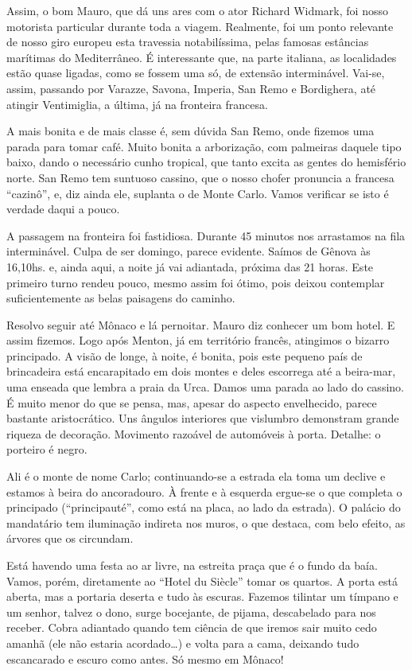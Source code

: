 Assim, o bom Mauro, que dá uns ares com o ator Richard Widmark, foi nosso motorista particular durante toda a viagem. Realmente, foi um ponto relevante de nosso giro europeu esta travessia notabilíssima, pelas famosas estâncias marítimas do Mediterrâneo. É interessante que, na parte italiana, as localidades estão quase ligadas, como se fossem uma só, de extensão interminável. Vai-se, assim, passando por Varazze, Savona, Imperia, San Remo e Bordighera, até atingir Ventimiglia, a última, já na fronteira francesa.

A mais bonita e de mais classe é, sem dúvida San Remo, onde fizemos uma parada para tomar café. Muito bonita a arborização, com palmeiras daquele tipo baixo, dando o necessário cunho tropical, que tanto excita as gentes do hemisfério norte. San Remo tem suntuoso cassino, que o nosso chofer pronuncia a francesa “cazinô”, e, diz ainda ele, suplanta o de Monte Carlo. Vamos verificar se isto é verdade daqui a pouco.

A passagem na fronteira foi fastidiosa. Durante 45 minutos nos arrastamos na fila interminável. Culpa de ser domingo, parece evidente. Saímos de Gênova às 16,10hs. e, ainda aqui, a noite já vai adiantada, próxima das 21 horas. Este primeiro turno rendeu pouco, mesmo assim foi ótimo, pois deixou contemplar suficientemente as belas paisagens do caminho.

Resolvo seguir até Mônaco e lá pernoitar. Mauro diz conhecer um bom hotel. E assim fizemos. Logo após Menton, já em território francês, atingimos o bizarro principado. A visão de longe, à noite, é bonita, pois este pequeno país de brincadeira está encarapitado em dois montes e deles escorrega até a beira-mar, uma enseada que lembra a praia da Urca. Damos uma parada ao lado do cassino. É muito menor do que se pensa, mas, apesar do aspecto envelhecido, parece bastante aristocrático. Uns ângulos interiores que vislumbro demonstram grande riqueza de decoração. Movimento razoável de automóveis à porta. Detalhe: o porteiro é negro.

Ali é o monte de nome Carlo; continuando-se a estrada ela toma um declive e estamos à beira do ancoradouro. À frente e à esquerda ergue-se o que completa o principado (“principauté”, como está na placa, ao lado da estrada). O palácio do mandatário tem iluminação indireta nos muros, o que destaca, com belo efeito, as árvores que os circundam.

Está havendo uma festa ao ar livre, na estreita praça que é o fundo da baía. Vamos, porém, diretamente ao “Hotel du Siècle” tomar os quartos. A porta está aberta, mas a portaria deserta e tudo às escuras. Fazemos tilintar um tímpano e um senhor, talvez o dono, surge bocejante, de pijama, descabelado para nos receber. Cobra adiantado quando tem ciência de que iremos sair muito cedo amanhã (ele não estaria acordado\ldots) e volta para a cama, deixando tudo escancarado e escuro como antes. Só mesmo em Mônaco!

